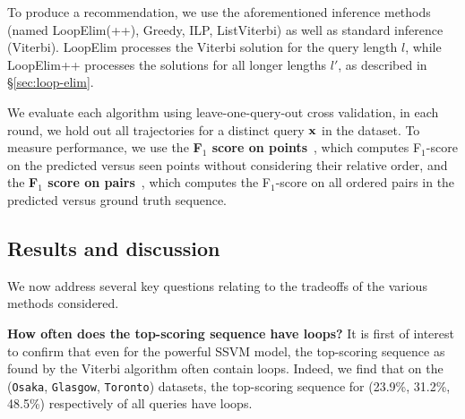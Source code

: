 %

To produce a recommendation,
we use 
the aforementioned inference methods (named {\sc LoopElim(++)}, {\sc Greedy}, {\sc ILP}, {\sc ListViterbi})
as well as
standard inference ({\sc Viterbi}).
{\sc LoopElim} processes the Viterbi solution for the query length $l$,
while {\sc LoopElim++} processes the solutions for all longer lengths $l'$, as described in \S\ref{sec:loop-elim}.

We evaluate each algorithm using leave-one-query-out cross validation,
\ie in each round, we hold out all trajectories for a distinct query $\mathbf{x}$ in the dataset.
To measure performance,
we use 
the {\bf F$_1$ score on points}~\cite{ijcai15}, which computes F$_1$-score on the predicted versus seen points
without considering their relative order,
and the {\bf F$_1$ score on pairs}~\cite{cikm16paper}, which computes the F$_1$-score on all ordered pairs in the predicted versus ground truth sequence. %




%
\subsection{Results and discussion}

We now address several key questions relating to the tradeoffs of the various methods considered.

\textbf{How often does the top-scoring sequence have loops?}
It is first of interest to confirm that
even for the powerful SSVM model,
the top-scoring sequence as found by the Viterbi algorithm often contain loops.
Indeed, we find that on the ({\tt Osaka}, {\tt Glasgow}, {\tt Toronto}) datasets, the top-scoring sequence for (23.9\%, 31.2\%, 48.5\%) respectively of all queries have loops.

